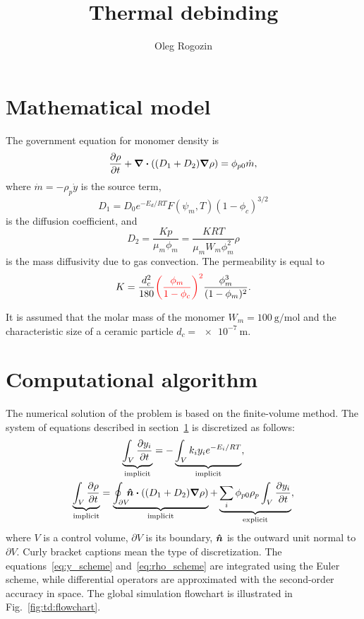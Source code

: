 \documentclass{article}
\title{Thermal debinding}
\author{Oleg Rogozin}
\newcommand{\bn}{\vu*{n}}
\newcommand{\V}{V}
\newcommand{\dV}{\partial V}
\newcommand{\intCell}{\int_{\V}}
\newcommand{\intFaces}{\oint_{\dV}\!\!\!\bn}
\newcommand{\implicit}[1]{\underbrace{#1}_\text{implicit}}
\newcommand{\explicit}[1]{\underbrace{#1}_\text{explicit}}
\newcommand{\alert}[1]{\textcolor{red}{#1}}
\begin{document}
\maketitle
\tableofcontents

\newcommand{\sectionbreak}{\clearpage}
\section{Mathematical model}\label{sec:td:model}

The government equation for monomer density is
\begin{equation}\label{eq:rho}
    \pdv{\rho}{t} + \div((D_1 + D_2)\grad\rho) = \phi_{p0}\dot{m},
\end{equation}
where $\dot{m} = -\rho_p\dot{y}$ is the source term,
\begin{equation}\label{eq:D1}
    D_1 = D_0e^{-E_d/RT}F(\psi_m,T)(1-\phi_c)^{3/2}
\end{equation}
is the diffusion coefficient, and
\begin{equation}\label{eq:D2}
    D_2 = \frac{Kp}{\mu_m\phi_m} = \frac{KRT}{\mu_mW_m\phi_m^2}\rho
\end{equation}
is the mass diffusivity due to gas convection.
The permeability is equal to
\begin{equation}\label{eq:K}
    K = \frac{d_c^2}{180}\alert{\qty(\frac{\phi_m}{1-\phi_c})^2}\frac{\phi_m^3}{(1-\phi_m)^2}.
\end{equation}

It is assumed that the molar mass of the monomer $W_m = \SI{100}{\g/\mol}$
and the characteristic size of a ceramic particle $d_c = \SI{e-7}{\m}$.

\section{Computational algorithm}

The numerical solution of the problem is based on the finite-volume method.
The system of equations described in section~\ref{sec:td:model} is discretized as follows:
\begin{gather}
    \implicit{\intCell \pdv{y_i}{t}} = -\implicit{\intCell k_iy_ie^{-E_i/RT}}, \label{eq:y_scheme}\\
    \implicit{\intCell \pdv{\rho}{t}} = \implicit{\intFaces \vdot((D_1+D_2)\grad\rho)}
        + \explicit{\sum_i\phi_{p0}\rho_p\intCell \pdv{y_i}{t} }, \label{eq:rho_scheme}
\end{gather}
where $\V$ is a control volume, $\dV$ is its boundary,
$\bn$ is the outward unit normal to $\dV$.
Curly bracket captions mean the type of discretization.
The equations~\eqref{eq:y_scheme} and~\eqref{eq:rho_scheme} are integrated using the Euler scheme,
while differential operators are approximated with the second-order accuracy in space. 
The global simulation flowchart is illustrated in Fig.~\ref{fig:td:flowchart}.
\end{document}
